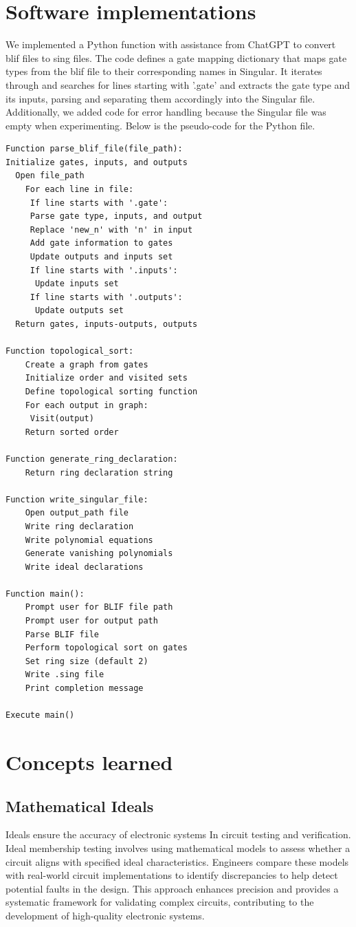 \documentclass[conference]{IEEEtran}
\begin{document}
\section{Software implementations}
We implemented a Python function with assistance from ChatGPT to convert blif files to sing files. The code defines a gate mapping dictionary that maps gate types 
from the blif file to their corresponding names in Singular. It iterates through and searches for lines starting with '.gate' and extracts the gate type and its 
inputs, parsing and separating them accordingly into the Singular file. Additionally, we added code for error handling because the Singular file was empty when 
experimenting. Below is the pseudo-code for the Python file. 
\begin{lstlisting}
Function parse_blif_file(file_path):
Initialize gates, inputs, and outputs
  Open file_path
    For each line in file:
     If line starts with '.gate':
     Parse gate type, inputs, and output
     Replace 'new_n' with 'n' in input
     Add gate information to gates
     Update outputs and inputs set
     If line starts with '.inputs':
      Update inputs set
     If line starts with '.outputs':
      Update outputs set
  Return gates, inputs-outputs, outputs
    
Function topological_sort:
    Create a graph from gates
    Initialize order and visited sets
    Define topological sorting function
    For each output in graph:
     Visit(output)
    Return sorted order
    
Function generate_ring_declaration:
    Return ring declaration string
    
Function write_singular_file:
    Open output_path file
    Write ring declaration 
    Write polynomial equations
    Generate vanishing polynomials
    Write ideal declarations
    
Function main():
    Prompt user for BLIF file path
    Prompt user for output path
    Parse BLIF file
    Perform topological sort on gates
    Set ring size (default 2)
    Write .sing file
    Print completion message
    
Execute main()
\end{lstlisting}

\section{Concepts learned}
\subsection{Mathematical Ideals}
Ideals ensure the accuracy of electronic systems In circuit testing and verification. 
Ideal membership testing involves using mathematical 
models to assess whether a circuit aligns with specified ideal characteristics. 
Engineers compare these models with real-world circuit implementations to identify 
discrepancies to help detect potential faults in the design. This approach enhances 
precision and provides a systematic framework for validating complex circuits, 
contributing to the development of high-quality electronic systems.
\end{document}
